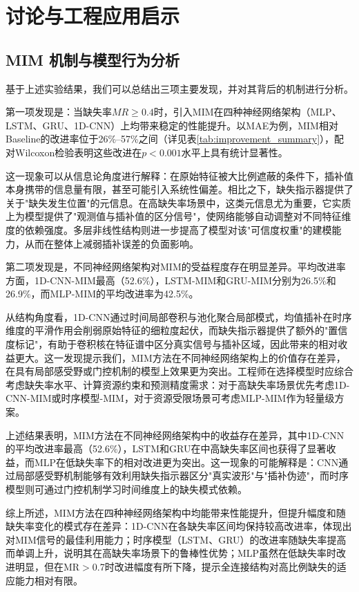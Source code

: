 \documentclass[10pt,a4paper]{ctexart}
\begin{document}
\section{讨论与工程应用启示}\label{sec:discussion}

\subsection{MIM 机制与模型行为分析}

基于上述实验结果，我们可以总结出三项主要发现，并对其背后的机制进行分析。

第一项发现是：当缺失率$MR \ge 0.4$时，引入MIM在四种神经网络架构（MLP、LSTM、GRU、1D-CNN）上均带来稳定的性能提升。以MAE为例，MIM相对Baseline的改进率位于26\%--57\%之间（详见表\ref{tab:improvement_summary}），配对Wilcoxon检验表明这些改进在$p<0.001$水平上具有统计显著性。

这一现象可以从信息论角度进行解释：在原始特征被大比例遮蔽的条件下，插补值本身携带的信息量有限，甚至可能引入系统性偏差。相比之下，缺失指示器提供了关于"缺失发生位置"的元信息。在高缺失率场景中，这类元信息尤为重要，它实质上为模型提供了"观测值与插补值的区分信号"，使网络能够自动调整对不同特征维度的依赖强度。多层非线性结构则进一步提高了模型对该"可信度权重"的建模能力，从而在整体上减弱插补误差的负面影响。

第二项发现是，不同神经网络架构对MIM的受益程度存在明显差异。平均改进率方面，1D-CNN-MIM最高（52.6\%），LSTM-MIM和GRU-MIM分别为26.5\%和26.9\%，而MLP-MIM的平均改进率为42.5\%。

从结构角度看，1D-CNN通过时间局部卷积与池化聚合局部模式，均值插补在时序维度的平滑作用会削弱原始特征的细粒度起伏，而缺失指示器提供了额外的"置信度标记"，有助于卷积核在特征谱中区分真实信号与插补区域，因此带来的相对收益更大。这一发现提示我们，MIM方法在不同神经网络架构上的价值存在差异，在具有局部感受野或门控机制的模型上效果更为突出。工程师在选择模型时应综合考虑缺失率水平、计算资源约束和预测精度需求：对于高缺失率场景优先考虑1D-CNN-MIM或时序模型-MIM，对于资源受限场景可考虑MLP-MIM作为轻量级方案。

上述结果表明，MIM方法在不同神经网络架构中的收益存在差异，其中1D-CNN的平均改进率最高（52.6\%），LSTM和GRU在中高缺失率区间也获得了显著收益，而MLP在低缺失率下的相对改进更为突出。这一现象的可能解释是：CNN通过局部感受野机制能够有效利用缺失指示器区分"真实波形"与"插补伪迹"，而时序模型则可通过门控机制学习时间维度上的缺失模式依赖。

综上所述，MIM方法在四种神经网络架构中均能带来性能提升，但提升幅度和随缺失率变化的模式存在差异：1D-CNN在各缺失率区间均保持较高改进率，体现出对MIM信号的最佳利用能力；时序模型（LSTM、GRU）的改进率随缺失率提高而单调上升，说明其在高缺失率场景下的鲁棒性优势；MLP虽然在低缺失率时改进明显，但在MR$>$0.7时改进幅度有所下降，提示全连接结构对高比例缺失的适应能力相对有限。
\end{document}
